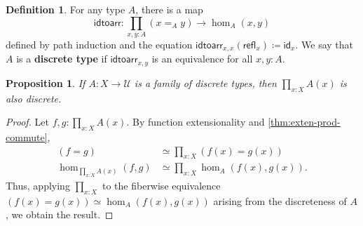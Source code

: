 \documentclass[12pt]{amsart}
\theoremstyle{plain}
\newtheorem{prop}[thm]{Proposition}
\theoremstyle{definition}
\newtheorem{defn}[thm]{Definition}
\theoremstyle{remark}
\numberwithin{equation}{section}
\newcommand{\defeq}{\coloneqq}
\newcommand{\univtype}{\mathcal{U}}
\newcommand{\refl}{\mathsf{refl}}
\newcommand{\idtoarr}{\mathsf{idtoarr}}
\newcommand{\idarr}[1]{\mathsf{id}_{#1}}
\begin{document}
\begin{defn}\label{defn:discrete}
  For any type $A$, there is a map
  \[ \idtoarr: \prod_{x,y :A} (x =_A y) \to \hom_A(x,y)\]
  defined by path induction and the equation $\idtoarr_{x,x}(\refl_x) \defeq \idarr x$.
  We say that $A$ is a \textbf{discrete type} if $\idtoarr_{x,y}$ is an equivalence for all $x,y:A$.
\end{defn}

\begin{prop}\label{thm:forall-discrete} If $A:X\to\univtype$ is a family of discrete types, then $\prod_{x:X} A(x)$ is also discrete.
\end{prop}
\begin{proof}
  Let $f,g:\prod_{x:X} A(x)$.
  By function extensionality and \cref{thm:exten-prod-commute},
  \begin{align*}
    (f=g) &\simeq \prod_{x:X} (f(x)=g(x))\\
    \hom_{\prod_{x:X} A(x)}(f,g) &\simeq \prod_{x:X}\hom_A(f(x),g(x)).
  \end{align*}
  Thus, applying $\prod_{x:X}$ to the fiberwise equivalence $(f(x)=g(x))\simeq \hom_A(f(x),g(x))$ arising from the discreteness of $A$, we obtain the result.
\end{proof}
\end{document}
